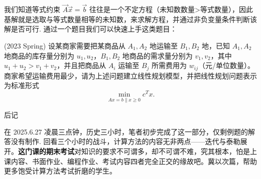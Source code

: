 我们知道等式约束 $\vec{A}\vec{x}=\vec{b}$ 往往是一个不定方程（未知数数量>等式数量），因此{\color{red} 基解就是选取与等式数量相等的未知数，来求解方程，并通过非负变量条件判断该解是否可行. } 通过一个题目我们可以快速上手这类题目：
\begin{problembox}
    \begin{example}
    (2023 Spring) 
    设某商家需要把某商品从 $A_1, A_2$ 地运输至 $B_1, B_2$ 地，已知 $A_1, A_2$ 地商品的库存量分别为 $u_1, u_2$，$B_1, B_2$ 地商品的需求量分别为 $v_1, v_2$，其中 $u_1 + u_2 > v_1 + v_2$，并且把商品从 $A_i$ 运输至 $B_j$ 所需费用为 $w_{ij}$（元/单位数量）。商家希望运输费用最少，请为上述问题建立线性规划模型，并把线性规划问题表示为标准形式
    \[ \min_{Ax=b \parallel x \geq 0} c^T x. \]
    \end{example}
    \begin{solution}
        
    \end{solution}
\end{problembox}


\vfill
\begin{center}
    \large 后记
\end{center}
{\kaishu \color{blue} 在 2025.6.27 凌晨三点钟，历史三小时，笔者初步完成了这一部分，仅剩例题的解答没有制作. 回看三个小时的战斗，计算方法的内容无非两点——迭代与泰勒展开。{\bf 这门课的期末考试}对知识的要求不可谓多，却不可谓不难，究其根本，怕是上课内容、书面作业、编程作业、考试内容四者完全正交的缘故吧。冀以次篇，帮助更多饱受计算方法考试折磨的学生。}
